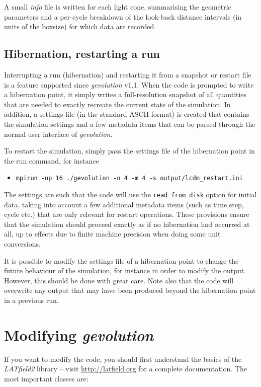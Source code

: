 \documentclass[a4paper,10pt]{article}
\begin{document}
A small \textit{info} file is written for each light cone, summarising the geometric parameters and a per-cycle breakdown of the look-back distance intervals
(in units of the boxsize) for which data are recorded.

\subsection{Hibernation, restarting a run}

Interrupting a run (hibernation) and restarting it from a snapshot or restart file is a feature supported since
\textit{gevolution} v1.1. When the code is prompted to write a hibernation point, it simply writes a full-resolution snapshot
of all quantities that are needed to exactly recreate the current state of the simulation. In addition, a settings file (in the
standard ASCII format) is created that contains the simulation settings and a few metadata items that can be parsed through the
normal user interface of \textit{gevolution}.

To restart the simulation, simply pass the settings file of the hibernation point in the run command, for instance

\begin{itemize}
 \item[] \texttt{mpirun -np 16 ./gevolution -n 4 -m 4 -s output/lcdm\_restart.ini} 
\end{itemize}

The settings are such that the code will use the \texttt{read from disk} option for initial data, taking into account a few
additional metadata items (such as time step, cycle etc.) that are only relevant for restart operations. These provisions
ensure that the simulation should proceed exactly as if no hibernation had occurred at all, up to effects due to finite machine
precision when doing some unit conversions.

It is possible to modify the settings file of a hibernation point to change the future behaviour of the simulation, for instance in order
to modify the output. However, this should be done with great care. Note also that the code will overwrite any output that may have
been produced beyond the hibernation point in a previous run.

\section{Modifying \textit{gevolution}}

If you want to modify the code, you should first understand the basics of the \textit{LATfield2} library -- visit \url{http://latfield.org} for a complete documentation. The most important classes are:
\end{document}
